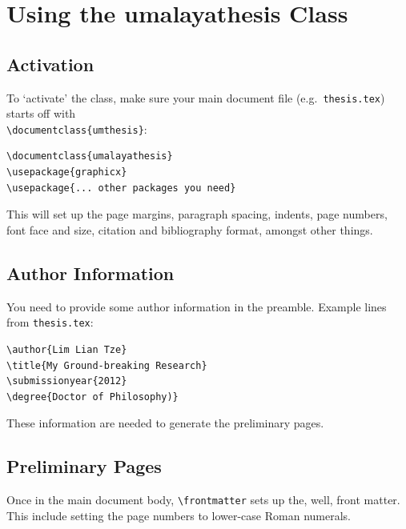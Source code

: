 \documentclass[a4paper,12pt]{scrartcl}
\begin{document}
\section{Using the umalayathesis Class}\label{sec:howto}

\subsection{Activation}\label{sec:activation}
To `activate' the class, make sure your main document file (e.g.\ \texttt{thesis.tex}) starts off with\\\lstinline|\documentclass{umthesis}|:

\medskip%

\begin{lstlisting}
\documentclass{umalayathesis}
\usepackage{graphicx}
\usepackage{... other packages you need}
\end{lstlisting}

\medskip

This will set up the page margins, paragraph spacing, indents, page numbers, font face and size, citation and bibliography format, amongst other things. 

\subsection{Author Information}\label{sec:author:info}
You need to provide some author information in the preamble. Example lines from \texttt{thesis.tex}:

\medskip

\begin{lstlisting}[moretexcs={submissionyear,submissionmonth,faculty,degree,qualification}]
\author{Lim Lian Tze}
\title{My Ground-breaking Research}
\submissionyear{2012}
\degree{Doctor of Philosophy)}
\end{lstlisting}

\medskip

These information are needed to generate the preliminary pages.

\subsection{Preliminary Pages}\label{sec:prelim:pages}
Once in the main document body, \lstinline[moretexcs={frontmatter}]|\frontmatter| sets up the, well, front matter. This include setting the page numbers to lower-case Roman numerals.
\end{document}
